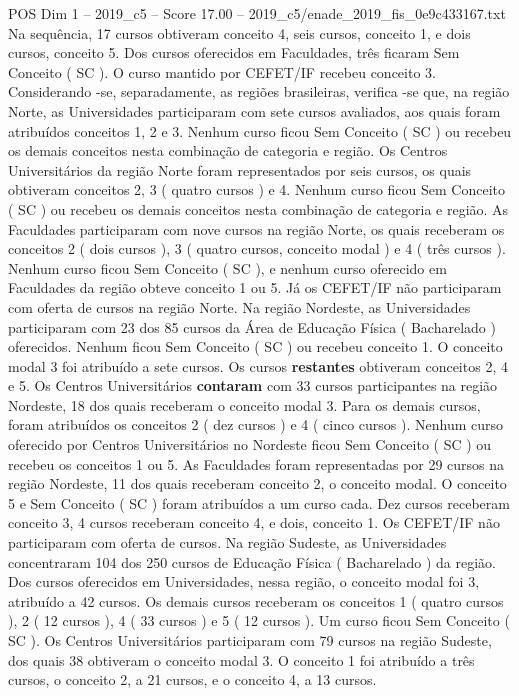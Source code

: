 \begin{textsample}{POS Dim 1 – 2019\_c5 – Score 17.00 – 2019\_c5/enade\_2019\_fis\_0e9c433167.txt}
Na sequência, 17 cursos obtiveram conceito 4, seis cursos, conceito 1, e dois cursos, conceito 5.
Dos cursos oferecidos em Faculdades, três ficaram Sem Conceito ( SC ).
O curso mantido por CEFET/IF recebeu conceito 3.
Considerando -se, separadamente, as regiões brasileiras, verifica -se que, na região Norte, as Universidades participaram com sete cursos avaliados, aos quais foram atribuídos conceitos 1, 2 e 3.
Nenhum curso ficou Sem Conceito ( SC ) ou recebeu os demais conceitos nesta combinação de categoria e região.
Os Centros Universitários da região Norte foram representados por seis cursos, os quais obtiveram conceitos 2, 3 ( quatro cursos ) e 4.
Nenhum curso ficou Sem Conceito ( SC ) ou recebeu os demais conceitos nesta combinação de categoria e região.
As Faculdades participaram com nove cursos na região Norte, os quais receberam os conceitos 2 ( dois cursos ), 3 ( quatro cursos, conceito modal ) e 4 ( três cursos ).
Nenhum curso ficou Sem Conceito ( SC ), e nenhum curso oferecido em Faculdades da região obteve conceito 1 ou 5.
Já os CEFET/IF não participaram com oferta de cursos na região Norte.
Na região Nordeste, as Universidades participaram com 23 dos 85 cursos da Área de Educação Física ( Bacharelado ) oferecidos.
Nenhum ficou Sem Conceito ( SC ) ou recebeu conceito 1.
O conceito modal 3 foi atribuído a sete cursos.
Os cursos \textbf{restantes} obtiveram conceitos 2, 4 e 5.
Os Centros Universitários \textbf{contaram} com 33 cursos participantes na região Nordeste, 18 dos quais receberam o conceito modal 3.
Para os demais cursos, foram atribuídos os conceitos 2 ( dez cursos ) e 4 ( cinco cursos ).
Nenhum curso oferecido por Centros Universitários no Nordeste ficou Sem Conceito ( SC ) ou recebeu os conceitos 1 ou 5.
As Faculdades foram representadas por 29 cursos na região Nordeste, 11 dos quais receberam conceito 2, o conceito modal.
O conceito 5 e Sem Conceito ( SC ) foram atribuídos a um curso cada.
Dez cursos receberam conceito 3, 4 cursos receberam conceito 4, e dois, conceito 1.
Os CEFET/IF não participaram com oferta de cursos.
Na região Sudeste, as Universidades concentraram 104 dos 250 cursos de Educação Física ( Bacharelado ) da região.
Dos cursos oferecidos em Universidades, nessa região, o conceito modal foi 3, atribuído a 42 cursos.
Os demais cursos receberam os conceitos 1 ( quatro cursos ), 2 ( 12 cursos ), 4 ( 33 cursos ) e 5 ( 12 cursos ).
Um curso ficou Sem Conceito ( SC ).
Os Centros Universitários participaram com 79 cursos na região Sudeste, dos quais 38 obtiveram o conceito modal 3.
O conceito 1 foi atribuído a três cursos, o conceito 2, a 21 cursos, e o conceito 4, a 13 cursos.

\end{textsample}
